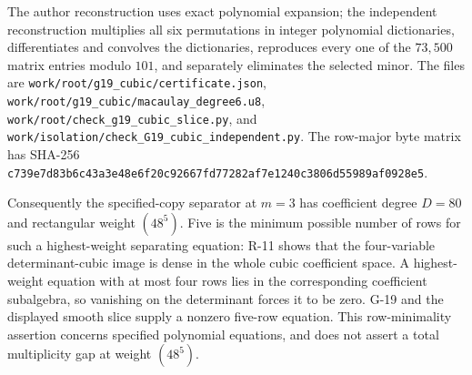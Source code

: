 The author reconstruction uses exact polynomial expansion; the
independent reconstruction multiplies all six permutations in
integer polynomial dictionaries, differentiates and convolves
the dictionaries, reproduces every one of the $73{,}500$ matrix
entries modulo $101$, and separately eliminates the selected
minor. The files are
\texttt{work/root/g19\_cubic/certificate.json},
\texttt{work/root/g19\_cubic/macaulay\_degree6.u8},
\texttt{work/root/check\_g19\_cubic\_slice.py}, and
\texttt{work/isolation/check\_G19\_cubic\_independent.py}.
The row-major byte matrix has SHA-256
\texttt{c739e7d83b6c43a3e48e6f20c92667fd77282af7e1240c3806d55989af0928e5}.

Consequently the specified-copy separator at $m=3$ has
coefficient degree $D=80$ and rectangular weight $(48^5)$.
Five is the minimum possible number of rows for such a
highest-weight separating equation: R-11 shows that the
four-variable determinant-cubic image is dense in the whole
cubic coefficient space. A highest-weight equation with at
most four rows lies in the corresponding coefficient
subalgebra, so vanishing on the determinant forces it to be
zero. G-19 and the displayed smooth slice supply a nonzero
five-row equation. This row-minimality assertion concerns
specified polynomial equations, and does not assert a total
multiplicity gap at weight $(48^5)$.


